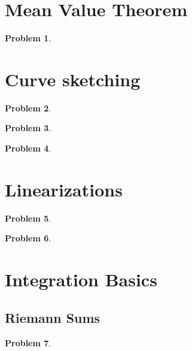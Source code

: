 \documentclass{article}
\newtheorem{problem}{Problem}
\begin{document}
\section{Mean Value Theorem}
\begin{problem}

\end{problem}


\section{Curve sketching}
\begin{problem}

\end{problem}


\begin{problem}

\end{problem}

\begin{problem}

\end{problem}

\section{Linearizations}
\begin{problem}

\end{problem}

\begin{problem}

\end{problem}


\section{Integration Basics}
\subsection{Riemann Sums}
\begin{problem}

\end{problem}

\end{document}
